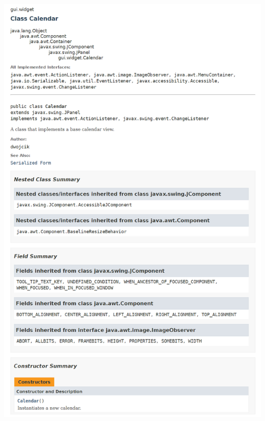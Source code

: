 \documentclass[a4paper,12pt]{article}
\begin{document}
\begin{minipage}{.75\textwidth}

    \includegraphics[width=\textwidth]{./screen/GUI/calendar.png}
    \label{MainViewLinux}

\end{minipage}
\end{document}
